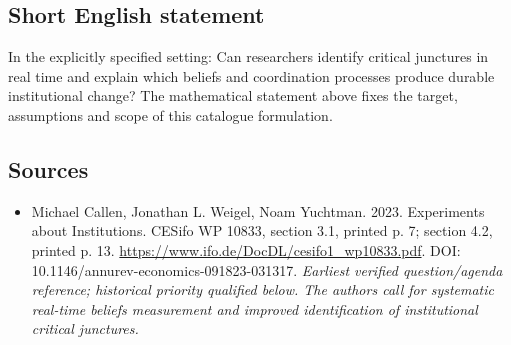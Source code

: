 \documentclass[11pt]{article}
\begin{document}
\subsection{Short English statement}
In the explicitly specified setting: Can researchers identify critical junctures in real time and explain which beliefs and coordination processes produce durable institutional change? The mathematical statement above fixes the target, assumptions and scope of this catalogue formulation.

\subsection{Sources}
\begin{itemize}\raggedright
\item[\textnormal{[S1]}]\hypertarget{source:30007662:1}{} Michael Callen, Jonathan L. Weigel, Noam Yuchtman. 2023. Experiments about Institutions. CESifo WP 10833, section 3.1, printed p. 7; section 4.2, printed p. 13.
\url{https://www.ifo.de/DocDL/cesifo1_wp10833.pdf}.
DOI: 10.1146/annurev-economics-091823-031317.
{\small\textit{Earliest verified question/agenda reference; historical priority qualified below. The authors call for systematic real-time beliefs measurement and improved identification of institutional critical junctures.}}
\end{itemize}
\end{document}
